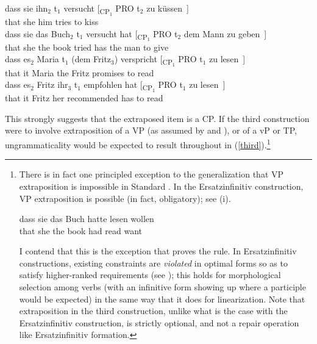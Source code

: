 \documentclass[output=paper]{langsci/langscibook}
\begin{document}
\ea\label{third} 
    \ea \gll dass \label{22a}sie ihn$_2$ t$_1$ versucht [\textsubscript{CP$_1$} PRO t$_2$ zu küssen~]\\
    that she\textsubscript{\Nom} him\textsubscript{\Acc} {} tries {} {} {} to kiss\\
    \ex \gll dass sie \label{22b}das Buch$_2$ t$_1$ versucht  hat [\textsubscript{CP$_1$} PRO t$_2$ dem Mann zu geben~]\\
    that she\textsubscript{\Nom} the book {} tried has {} {} {} the man\textsubscript{\Dat} to give\\
    \ex \gll dass es$_2$ Maria \label{2co}t$_1$ (dem Fritz$_3$) verspricht [\textsubscript{CP$_1$} PRO t$_1$ zu lesen~]\\
    that it\textsubscript{\Acc} Maria {} \phantom{(}the Fritz\textsubscript{\Dat} promises {} {} {} to read\\
    \ex \gll dass es$_2$ Fritz ihr$_3$ t$_1$ \label{3co}empfohlen hat [\textsubscript{CP$_1$} PRO t$_1$ zu lesen~]\\
    that it\textsubscript{\Acc} Fritz\textsubscript{\Nom} her\textsubscript{\Dat} {} recommended has {} {} {} to read\\
    \z
\z

\largerpage[-2]
This strongly suggests that the extraposed item is a CP. If the third
construction were to involve extraposition of a VP (as assumed by
\citealt{Woellstein:01} and \citealt{Haider:10}), or of a vP or TP,
ungrammaticality would be expected to result throughout in
(\ref{third}).\footnote{There is in fact one principled exception to the
    generalization that VP extraposition is impossible in Standard . In
    the Ersatzinfinitiv construction, VP extraposition is possible (in fact,
    obligatory); see (i).

\begin{exe}
    \gll dass sie das Buch  hatte lesen wollen\\
that she\textsubscript{\Nom} the book\textsubscript{\Acc} had read want\\
\end{exe}

I contend that this is the exception that proves the rule. In Ersatzinfinitiv
constructions, existing constraints are {\itshape violated} in optimal forms so as
to satisfy higher-ranked requirements (see \citealt{Schmid:05}); this holds for
morphological selection among verbs (with an infinitive form showing up where a
participle would be expected) in the same way that it does for linearization.
Note that extraposition in the third construction, unlike what is the case with
the Ersatzinfinitiv construction, is strictly optional, and not a repair
operation like Ersatzinfinitiv formation.}
\end{document}
